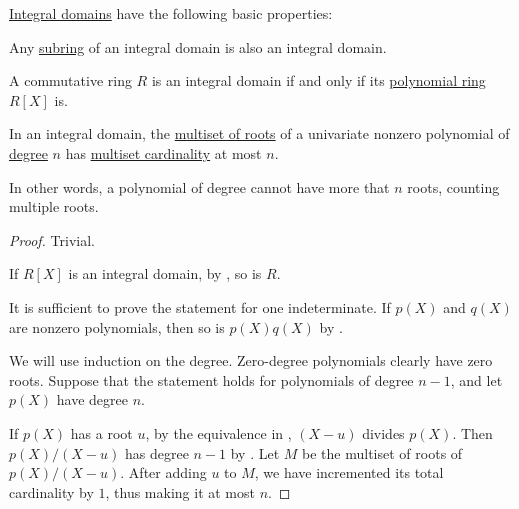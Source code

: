 \begin{proposition}\label{thm:def:integral_domain}
  \hyperref[def:integral_domain]{Integral domains} have the following basic properties:
  \begin{thmenum}
     Any \hyperref[def:ring/submodel]{subring} of an integral domain is also an integral domain.

     A commutative ring \( R \) is an integral domain if and only if its \hyperref[def:polynomial_algebra]{polynomial ring} \( R[X] \) is.

     In an integral domain, the \hyperref[def:polynomial_root]{multiset of roots} of a univariate nonzero polynomial of \hyperref[def:polynomial_degree]{degree} \( n \) has \hyperref[def:labeled_set/multiset]{multiset cardinality} at most \( n \).

    In other words, a polynomial of degree cannot have more that \( n \) roots, counting multiple roots.
  \end{thmenum}
\end{proposition}
\begin{proof}
   Trivial.


  \NecessitySubProof* If \( R[X] \) is an integral domain, by , so is \( R \).

  \SufficiencySubProof* It is sufficient to prove the statement for one indeterminate. If \( p(X) \) and \( q(X) \) are nonzero polynomials, then so is \( p(X) q(X) \) by .

   We will use induction on the degree. Zero-degree polynomials clearly have zero roots. Suppose that the statement holds for polynomials of degree \( n - 1 \), and let \( p(X) \) have degree \( n \).

  If \( p(X) \) has a root \( u \), by the equivalence in , \( (X - u) \) divides \( p(X) \). Then \( p(X) / (X - u) \) has degree \( n - 1 \) by . Let \( M \) be the multiset of roots of \( p(X) / (X - u) \). After adding \( u \) to \( M \), we have incremented its total cardinality by \( 1 \), thus making it at most \( n \).
\end{proof}

